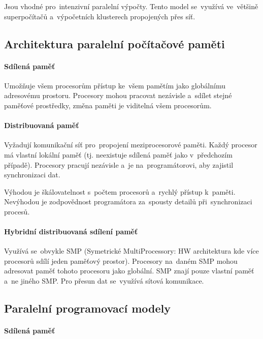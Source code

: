 Jsou vhodné pro~intenzivní paralelní výpočty. Tento model se~využívá ve~většině superpočítačů a~výpočetních klusterech propojených přes síť.

\subsection{Architektura paralelní počítačové paměti}

\paragraph{Sdílená paměť}

Umožňuje všem procesorům přístup ke~všem pamětím jako globálnímu adresovému prostoru. Procesory mohou pracovat nezávisle a~sdílet stejné paměťové prostředky, změna paměti je viditelná všem procesorům.

\paragraph{Distribuovaná paměť}

Vyžadují komunikační síť pro~propojení meziprocesorové paměti. Každý procesor má vlastní lokální paměť (tj. neexistuje sdílená paměť jako v~předchozím případě). Procesory pracují nezávisle a~je na~programátorovi, aby zajistil synchronizaci dat.

Výhodou je škálovatelnost s~počtem procesorů a~rychlý přístup k~paměti. Nevýhodou je zodpovědnost programátora za~spousty detailů při~synchronizaci procesů.

\paragraph{Hybridní distribuovaná sdílení paměť}

Využívá se~obvykle SMP (Symetrické MultiProcessory: HW architektura kde více procesorů sdílí jeden paměťový prostor). Procesory na~daném SMP mohou adresovat paměť tohoto procesoru jako globální. SMP znají pouze vlastní paměť a~ne jiného SMP. Pro přesun dat se~využívá sítová komunikace.

\subsection{Paralelní programovací modely}

\paragraph{Sdílená paměť}


